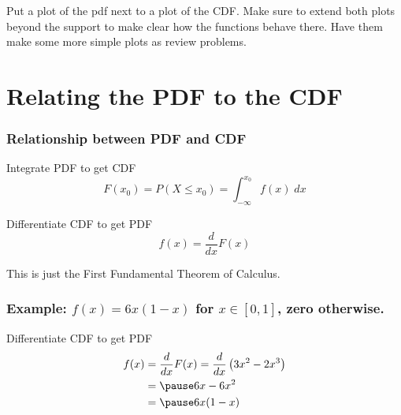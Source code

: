 \begin{frame}
  Put a plot of the pdf next to a plot of the CDF.
  Make sure to extend both plots beyond the support to make clear how the functions behave there.
  Have them make some more simple plots as review problems. 
\end{frame}
\section{Relating the PDF to the CDF}


\begin{frame}
\frametitle{Relationship between PDF and CDF}

\begin{block}{Integrate PDF to get CDF}
	\[
    F(x_0) = P(X\leq x_0) = \int_{-\infty}^{x_0} f(x)\; dx
  \]
\end{block}

\begin{block}{Differentiate CDF to get PDF}
 	\[
    f(x) =\frac{d}{dx}F(x)
  \]
\end{block}

\alert{This is just the First Fundamental Theorem of Calculus.}
\end{frame}


\begin{frame}
  \frametitle{Example: $f(x) = 6x(1-x)$ for $x \in [0,1]$, zero otherwise.}

  \begin{block}{Differentiate CDF to get PDF}
    \begin{align*}
      f(x) &= \frac{d}{dx}F(x) = \frac{d}{dx} \left( 3x^2 - 2x^3 \right)\\
      &= \pause 6x - 6x^2\\
      &= \pause 6x(1 - x)
    \end{align*}
  \end{block}
\end{frame}

